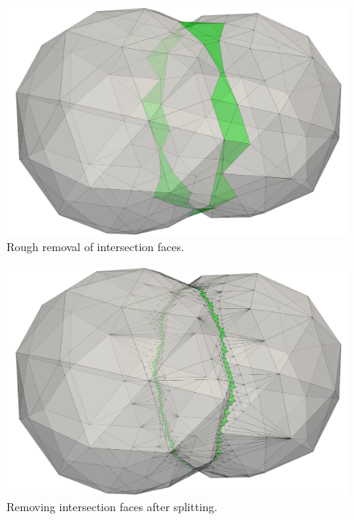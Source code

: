 \begin{figure}[h]
\centering
\includegraphics[width=\textwidth]{pics/text_1_int/pic_zip_09.png}
\caption{Rough removal of intersection faces.}\label{fig:pic_zip_09}
\end{figure}

\begin{figure}[h]
\centering
\includegraphics[width=\textwidth]{pics/text_1_int/pic_zip_15.png}
\caption{Removing intersection faces after splitting.}\label{fig:pic_zip_15}
\end{figure}

